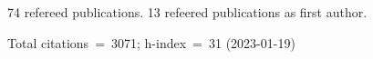 74 refereed publications. 13 refeered publications as first author.

Total citations~=~3071; h-index~=~31 (2023-01-19)
